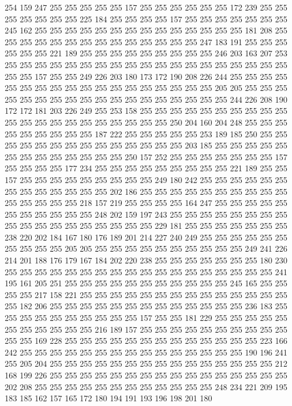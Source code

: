 254 159 247 255 255 255 255 255 157 255 255 255 255 255 255 172 239 255 255 255
255 255 255 255 225 184 255 255 255 255 157 255 255 255 255 255 255 255 245 162
255 255 255 255 255 255 255 255 255 255 255 255 255 255 181 208 255 255 255 255
255 255 255 255 255 255 255 255 255 255 247 183 191 255 255 255 255 255 255 221
189 255 255 255 255 255 255 255 255 255 246 203 163 207 253 255 255 255 255 255
255 255 255 255 255 255 255 255 255 255 255 255 255 255 255 255 157 255 255 249
226 203 180 173 172 190 208 226 244 255 255 255 255 255 255 255 255 255 255 255
255 255 255 255 255 255 255 205 205 255 255 255 255 255 255 255 255 255 255 255
255 255 255 255 255 255 255 244 226 208 190 172 172 181 203 226 249 255 253 158
255 255 255 255 255 255 255 255 255 255 255 255 255 255 255 255 255 255 255 255
255 250 204 160 204 248 255 255 255 255 255 255 255 255 255 187 222 255 255 255
255 255 253 189 185 250 255 255 255 255 255 255 255 255 255 255 255 255 255 255
203 185 255 255 255 255 255 255 255 255 255 255 255 255 255 250 157 252 255 255
255 255 255 255 255 157 255 255 255 255 177 234 255 255 255 255 255 255 255 255
255 221 189 255 255 157 255 255 255 255 255 255 255 255 255 249 180 242 255 255
255 255 255 255 255 255 255 255 255 255 255 202 186 255 255 255 255 255 255 255
255 255 255 255 255 255 255 255 218 157 219 255 255 255 255 164 247 255 255 255
255 255 255 255 255 255 255 255 248 202 159 197 243 255 255 255 255 255 255 255
255 255 255 255 255 255 255 255 255 255 255 229 181 255 255 255 255 255 255 255
238 220 202 184 167 180 176 189 201 214 227 240 249 255 255 255 255 255 255 255
255 255 255 205 205 255 255 255 255 255 255 255 255 255 255 249 241 226 214 201
188 176 179 167 184 202 220 238 255 255 255 255 255 255 255 180 230 255 255 255
255 255 255 255 255 255 255 255 255 255 255 255 255 255 255 241 195 161 205 251
255 255 255 255 255 255 255 255 255 255 255 245 165 255 255 255 255 217 158 221
255 255 255 255 255 255 255 255 255 255 255 255 255 255 255 182 206 255 255 255
255 255 255 255 255 255 255 255 255 255 236 183 255 255 255 255 255 255 255 255
255 255 157 255 255 181 229 255 255 255 255 255 255 255 255 255 255 255 216 189
157 255 255 255 255 255 255 255 255 255 255 255 255 169 228 255 255 255 255 255
255 255 255 255 255 255 255 255 223 166 242 255 255 255 255 255 255 255 255 255
255 255 255 255 255 255 190 196 241 255 205 204 255 255 255 255 255 255 255 255
255 255 255 255 255 255 255 212 168 199 226 255 255 255 255 255 255 255 255 255
255 255 255 255 255 255 255 202 208 255 255 255 255 255 255 255 255 255 255 255
255 248 234 221 209 195 183 185 162 157 165 172 180 194 191 193 196 198 201 180

